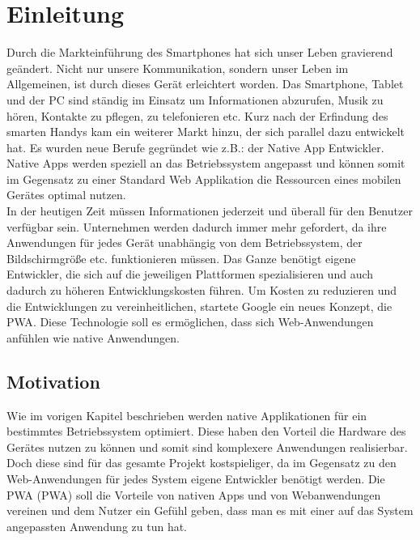 \chapter{Einleitung}\label{chap:Einleitung}
\thispagestyle{standard}
\pagestyle{standard}
\renewcommand{\footrulewidth}{0.4pt}

Durch die Markteinführung des Smartphones hat sich unser Leben gravierend geändert. 
Nicht nur unsere Kommunikation, sondern unser Leben im Allgemeinen, ist durch dieses Gerät erleichtert worden.
Das Smartphone, Tablet und der PC sind ständig im Einsatz um Informationen abzurufen, Musik zu hören, Kontakte zu pflegen, zu telefonieren etc. Kurz nach der Erfindung des smarten Handys kam ein weiterer Markt 
hinzu, der sich parallel dazu entwickelt hat. Es wurden neue Berufe gegründet wie z.B.: der Native App Entwickler.
Native Apps werden speziell an das Betriebssystem angepasst und können somit im Gegensatz zu einer Standard Web Applikation die Ressourcen eines mobilen Gerätes optimal nutzen.\\ In der heutigen Zeit müssen Informationen jederzeit und überall für den Benutzer verfügbar sein. Unternehmen werden dadurch immer mehr gefordert, da ihre Anwendungen für jedes Gerät unabhängig von dem Betriebssystem, der Bildschirmgröße etc. funktionieren müssen. Das Ganze benötigt eigene Entwickler, die sich auf die jeweiligen Plattformen spezialisieren und auch dadurch zu höheren Entwicklungskosten führen. Um Kosten zu reduzieren und die Entwicklungen zu vereinheitlichen, startete Google ein neues Konzept, die \acl{PWA}. 
Diese Technologie soll es ermöglichen, dass sich Web-Anwendungen anfühlen wie native Anwendungen.   


\section{Motivation} \label{sub:Motivation}
Wie im vorigen Kapitel beschrieben werden native Applikationen für ein bestimmtes Betriebssystem optimiert. Diese haben den Vorteil die Hardware des Gerätes nutzen zu können und somit sind komplexere Anwendungen realisierbar. Doch diese sind für das gesamte Projekt kostspieliger, da im Gegensatz zu den Web-Anwendungen für jedes System eigene Entwickler benötigt werden.
Die \acl{PWA} (\acs{PWA}) soll die Vorteile von nativen Apps und von Webanwendungen vereinen und dem Nutzer ein Gefühl geben, dass man es mit einer auf das System angepassten Anwendung zu tun hat.  




